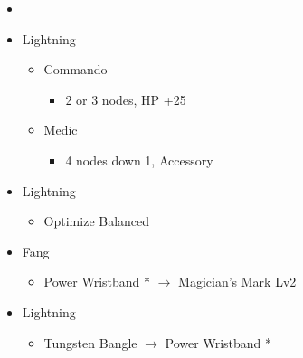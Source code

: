 	\begin{menu}
		\begin{itemize}
			\paradigm
			\begin{itemize}
				\item {}%
				      {\paradigmline[1]{\textit{\com}}{\textit{\com}}{\textit{\rav}}}
				      {\paradigmline{\rav}{\com}{\rav}}%
				      {\paradigmline{\rav}{\sab}{\rav}}%
				      {\paradigmline{\rav}{\sen}{\rav}}%
				      {\paradigmline{(\com)}{(\com)}{\syn}}%
				      {\paradigmline{\rav}{\com}{\rav}}
			\end{itemize}
			\crystarium
			\begin{itemize}
				\item Lightning
				      \begin{itemize}
					      \item Commando
					            \begin{itemize}
						            \item 2 or 3 nodes, HP +25
					            \end{itemize}
					      \item Medic
					            \begin{itemize}
						            \item 4 nodes down 1, Accessory
					            \end{itemize}
				      \end{itemize}
			\end{itemize}
			\equip
			\begin{itemize}
				\item Lightning
				      \begin{itemize}
					      \item Optimize Balanced
				      \end{itemize}
				\item Fang
				      \begin{itemize}
					      \item Power Wristband * $\rightarrow$ Magician's Mark Lv2
				      \end{itemize}
				\item Lightning
				      \begin{itemize}
					      \item Tungsten Bangle $\rightarrow$ Power Wristband *
				      \end{itemize}
			\end{itemize}
		\end{itemize}
	\end{menu}

